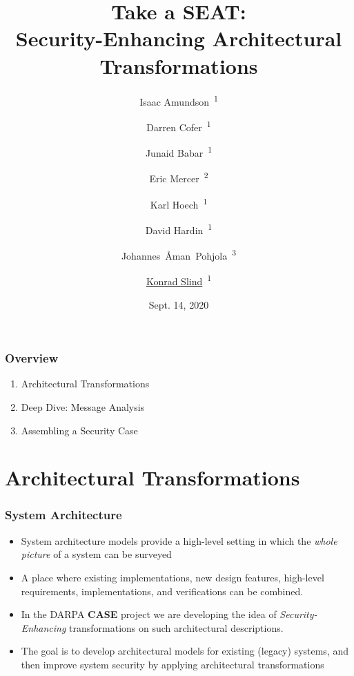 \documentclass{beamer}
\begin{document}

\author{Isaac Amundson~\textsuperscript{1} \and %
Darren Cofer~\textsuperscript{1} \and %
Junaid Babar~\textsuperscript{1} \and %
Eric Mercer~\textsuperscript{2} \and %
Karl Hoech~\textsuperscript{1} \and %
David Hardin~\textsuperscript{1} \and %
Johannes~{\AA}man~Pohjola~\textsuperscript{3} \and %
\underline{Konrad Slind}~\textsuperscript{1}
}


\date{Sept. 14, 2020}
\title{Take a SEAT: \\ Security-Enhancing Architectural Transformations}
\maketitle

\begin{frame}\frametitle{Overview}
\begin{enumerate}
\item Architectural Transformations
\item Deep Dive: Message Analysis
\item Assembling a Security Case
\end{enumerate}
\end{frame}


\section {Architectural Transformations}

\begin{frame}\frametitle{System Architecture}
\begin{itemize}

\item System architecture models provide a high-level setting in which
  the \emph{whole picture} of a system can be surveyed

\item A place where existing implementations, new design features, high-level
  requirements, implementations, and verifications can be combined.

\item In the DARPA \textbf{CASE} project we are developing the idea of
  \emph{Security-Enhancing} transformations on such architectural
  descriptions.

\item The goal is to develop architectural models for existing
  (legacy) systems, and then improve system security by applying architectural
  transformations

\end{itemize}

\end{frame}
\end{document}
